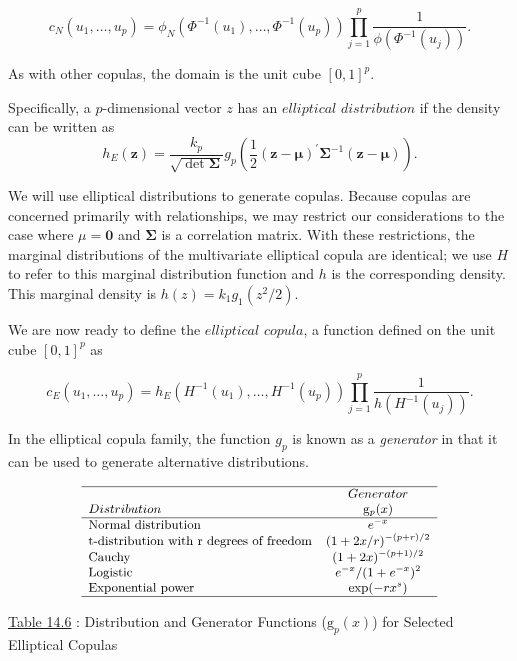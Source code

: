 \documentclass[]{book}
\theoremstyle{definition}
\theoremstyle{definition}
\theoremstyle{definition}
\theoremstyle{remark}
\begin{document}
\[{c}_N(u_1,  \ldots, u_p) = \phi_N \left(\Phi^{-1}(u_1), \ldots, \Phi^{-1}(u_p) \right) \prod_{j=1}^p \frac{1}{\phi(\Phi^{-1}(u_j))}.\]

As with other copulas, the domain is the unit cube \([0,1]^p\).

Specifically, a \(p\)-dimensional vector \({z}\) has an \({elliptical}\)
\({distribution}\) if the density can be written as
\[h_E (\mathbf{z})= \frac{k_p}{\sqrt{\det \boldsymbol \Sigma}}
g_p \left( \frac{1}{2} (\mathbf{z}- \boldsymbol \mu)^{\prime}
\boldsymbol \Sigma^{-1}(\mathbf{z}- \boldsymbol \mu) \right).\]

We will use elliptical distributions to generate copulas. Because
copulas are concerned primarily with relationships, we may restrict our
considerations to the case where \(\mu = \mathbf{0}\) and
\(\boldsymbol \Sigma\) is a correlation matrix. With these restrictions,
the marginal distributions of the multivariate elliptical copula are
identical; we use \(H\) to refer to this marginal distribution function
and \(h\) is the corresponding density. This marginal density is
\(h(z) = k_1 g_1(z^2/2).\)

We are now ready to define the \(elliptical\) \(copula\), a function
defined on the unit cube \([0,1]^p\) as

\[{c}_E(u_1,  \ldots, u_p) = h_E \left(H^{-1}(u_1), \ldots,
H^{-1}(u_p) \right) \prod_{j=1}^p \frac{1}{h(H^{-1}(u_j))}.\]

In the elliptical copula family, the function \(g_p\) is known as a
\emph{generator} in that it can be used to generate alternative
distributions.

\[
\small\begin{array}{lc}
\hline & Generator \\
 Distribution &  \mathrm{g}_p(x)  \\
\hline
 \text{Normal distribution} &  e^{-x}\\
 \text{t-distribution with r degrees of freedom} &   (1+2x/r)^{-(p+r)/2}\\
 \text{Cauchy} &  (1+2x)^{-(p+1)/2}\\
\text{Logistic} &  e^{-x}/(1+e^{-x})^2\\
 \text{Exponential power} &   \exp(-rx^s)\\
\hline
\end{array}
\]

\protect\hyperlink{tab:14.6}{Table 14.6} : Distribution and Generator
Functions (\(\mathrm{g}_p(x)\)) for Selected Elliptical Copulas
\end{document}
